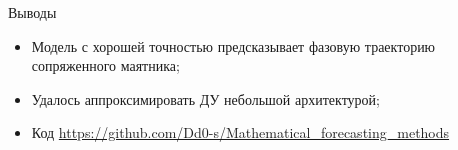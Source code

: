 \documentclass{beamer}
\begin{document}

\begin{frame}{Выводы}
    \begin{itemize}
        \item Модель с хорошей точностью предсказывает фазовую траекторию сопряженного маятника;
        \item Удалось аппроксимировать ДУ небольшой архитектурой;
        \item Код \url{https://github.com/Dd0-s/Mathematical_forecasting_methods}
    \end{itemize}
\end{frame}

\end{document}
